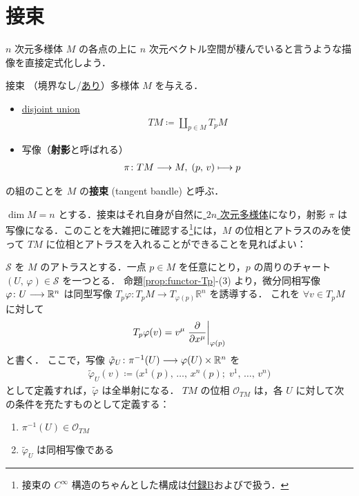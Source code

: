 \documentclass[geometry_main]{subfiles}
\begin{document}

\section{接束}

$n$ 次元\cinfty 多様体 $M$ の各点の上に $n$ 次元ベクトル空間が棲んでいると言うような描像を直接定式化しよう．

\begin{mydef}[label=def:bundle-tangent]{接束} 
	（境界なし/\hyperref[def:mani-with-boundary]{あり}）\cinfty 多様体 $M$ を与える．
	\begin{itemize}
		\item \hyperref[def:sum-sets]{disjoint union}
		\begin{align} 
			TM \coloneqq \coprod_{p \in M} T_pM
		\end{align}
		\item 写像（\textbf{射影}と呼ばれる）
		\begin{align} 
			&\pi \colon TM \longrightarrow M,\; (p,\, v) \longmapsto p
		\end{align}
	\end{itemize}
	の組のことを $M$ の\textbf{接束} (tangent bandle) と呼ぶ．
\end{mydef}

$\dim M = n$ とする．接束はそれ自身が自然に\underline{ $2n$ 次元\cinfty 多様体}になり，射影 $\pi$ は \cinfty 写像になる．このことを大雑把に確認する\footnote{接束の $C^\infty$ 構造のちゃんとした構成は\hyperref[appendixB]{付録B}およびで扱う．}には，$M$ の位相と\cinfty アトラスのみを使って $TM$ に位相と\cinfty アトラスを入れることができることを見ればよい：

$\mathcal{S}$ を $M$ のアトラスとする．一点 $p \in M$ を任意にとり，$p$ の周りのチャート $(U,\, \varphi) \in \mathcal{S}$ を一つとる．
命題\ref{prop:functor-Tp}-(3) より，微分同相写像 $\varphi \colon U \longrightarrow \mathbb{R}^n$ は同型写像 $T_p \varphi \colon T_p M \to T_{\varphi(p)} \mathbb{R}^n$ を誘導する．
これを $\forall v \in T_p M$ に対して
\begin{align} 
	T_p \varphi (v) = v^\mu \eval{\pdv{}{x^\mu}}_{\varphi(p)}
\end{align}
と書く．
ここで，写像 $\tilde{\varphi}_U \colon \pi^{-1}(U) \longrightarrow \varphi(U) \times \mathbb{R}^n$ を
\begin{align} 
	\tilde{\varphi}_U(v) \coloneqq \bigl( x^1(p),\, \dots ,\, x^n(p);\; v^1,\, \dots ,\, v^n \bigr)
\end{align}
として定義すれば，$\tilde{\varphi}$ は全単射になる． 
$TM$ の位相 $\mathscr{O}_{TM}$ は，各 $U$ に対して次の条件を充たすものとして定義する：
\begin{enumerate} 
	\item $\pi^{-1}(U) \in \mathscr{O}_{TM}$ 
	\item $\tilde{\varphi}_U$ は同相写像である
\end{enumerate}
\end{document}
